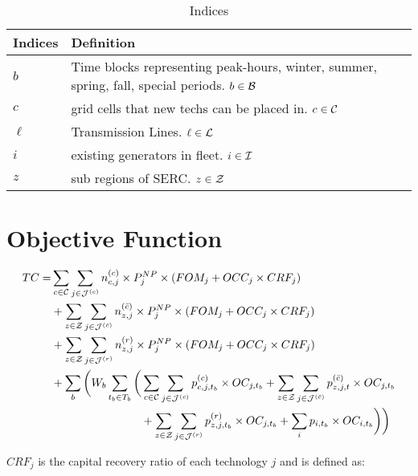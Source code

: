 \documentclass[11pt, oneside]{article}   	%
\newcommand{\bc}{\bar{c}}
\begin{document}
\begin{table}[H]
   \centering
   \caption{Indices}
   \begin{tabular}{p{1in} p{4in} } %
      \toprule
      \textbf{Indices} & \textbf{Definition} \\
      \midrule
      $b$ & Time blocks representing peak-hours, winter, summer, spring, fall, special periods. $b \in \mathcal{B}$\\
      $c$ & grid cells that new techs can be placed in. $c \in \mathcal{C}$ \\
      $\ell$ & Transmission Lines. $\ell \in \mathcal{L}$\\
      $i$ & existing generators in fleet. $i \in \mathcal{I}$\\
      $z$ & sub regions of SERC. $z \in \mathcal{Z}$\\
      \bottomrule
   \end{tabular}
   \label{tab:indices}
\end{table}

\section{Objective Function}

\begin{equation} \label{eq:obj_fun}
\begin{split}
TC = &  \sum_{c \in \Cc}\sum_{j \in \Jc^{(c)}} n^{(c)}_{c, j} \times P^{NP}_{j} \times (FOM_{j} + OCC_{j} \times CRF_{j}) \\
& +  \sum_{z \in \Zc}\sum_{j \in \Jc^{(\bc)}} n^{(\bc)}_{z, j} \times P^{NP}_{j} \times (FOM_{j} + OCC_{j} \times CRF_{j}) \\
& +  \sum_{z \in \Zc}\sum_{j \in \Jc^{(r)}} n^{(r)}_{z, j} \times P^{NP}_{j} \times (FOM_{j} + OCC_{j} \times CRF_{j}) \\
& + \sum_b \bigg( W_b \sum_{t_b \in T_b}\bigg( \sum_{c \in \Cc}\sum_{j \in \Jc^{(c)}} p^{(c)}_{c, j, t_b} \times OC_{j, t_b} + \sum_{z \in \Zc}\sum_{j \in \Jc^{(\bc)}} p^{(\bc)}_{z, j, t} \times OC_{j, t_b} \\
& \qquad\qquad\qquad\qquad +  \sum_{z \in \Zc}\sum_{j \in \Jc^{(r)}} p^{(r)}_{z, j, t_b} \times OC_{j, t_b} + \sum_{i} p_{i, t_b} \times OC_{i, t_b} \bigg)\bigg)
\end{split}
\end{equation}

$CRF_j$ is the capital recovery ratio of each technology $j$ and is defined as:
\end{document}
